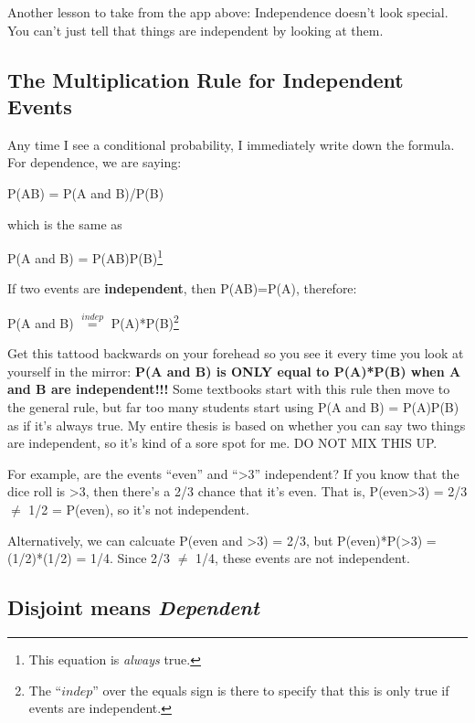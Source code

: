 \documentclass[
  letterpaper,
  DIV=11,
  numbers=noendperiod]{scrreprt}
\begin{document}
Another lesson to take from the app above: Independence doesn't look
special. You can't just tell that things are independent by looking at
them.

\hypertarget{the-multiplication-rule-for-independent-events}{%
\subsection{The Multiplication Rule for Independent
Events}\label{the-multiplication-rule-for-independent-events}}

Any time I see a conditional probability, I immediately write down the
formula. For dependence, we are saying:

P(A\textbar B) = P(A and B)/P(B)

which is the same as

P(A and B) = P(A\textbar B)P(B)\footnote{This equation is \emph{always}
  true.}

If two events are \textbf{independent}, then P(A\textbar B)=P(A),
therefore:

P(A and B) \(\stackrel{indep}{=}\) P(A)*P(B)\footnote{The ``\(indep\)''
  over the equals sign is there to specify that this is only true if
  events are independent.}

Get this tattood backwards on your forehead so you see it every time you
look at yourself in the mirror: \textbf{P(A and B) is ONLY equal to
P(A)*P(B) when A and B are independent!!!} Some textbooks start with
this rule then move to the general rule, but far too many students start
using P(A and B) = P(A)P(B) as if it's always true. My entire thesis is
based on whether you can say two things are independent, so it's kind of
a sore spot for me. DO NOT MIX THIS UP.

For example, are the events ``even'' and ``\textgreater3'' independent?
If you know that the dice roll is \textgreater3, then there's a 2/3
chance that it's even. That is, P(even\textbar\textgreater3) = 2/3
\(\ne\) 1/2 = P(even), so it's not independent.

Alternatively, we can calcuate P(even and \textgreater3) = 2/3, but
P(even)*P(\textgreater3) = (1/2)*(1/2) = 1/4. Since 2/3 \(\ne\) 1/4,
these events are not independent.

\hypertarget{disjoint-means-dependent}{%
\subsection{\texorpdfstring{Disjoint means
\emph{Dependent}}{Disjoint means Dependent}}\label{disjoint-means-dependent}}
\end{document}
